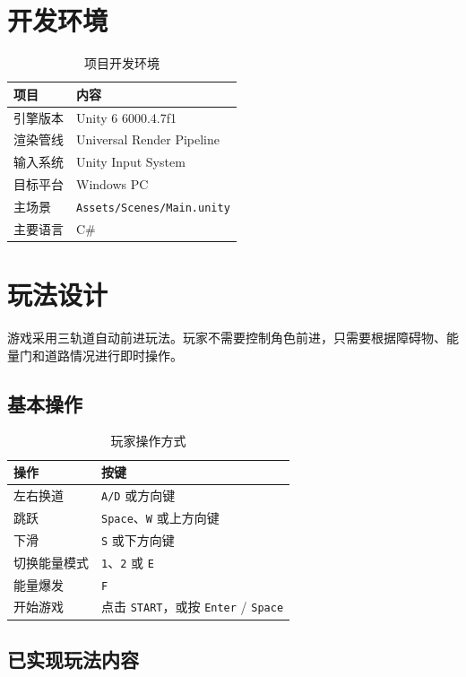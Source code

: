 \documentclass[UTF8,a4paper,12pt]{ctexart}
\begin{document}
\section{开发环境}

\begin{table}[H]
\centering
\begin{tabular}{ll}
\toprule
项目 & 内容 \\
\midrule
引擎版本 & Unity 6 6000.4.7f1 \\
渲染管线 & Universal Render Pipeline \\
输入系统 & Unity Input System \\
目标平台 & Windows PC \\
主场景 & \texttt{Assets/Scenes/Main.unity} \\
主要语言 & C\# \\
\bottomrule
\end{tabular}
\caption{项目开发环境}
\end{table}

\section{玩法设计}

游戏采用三轨道自动前进玩法。玩家不需要控制角色前进，只需要根据障碍物、能量门和道路情况进行即时操作。

\subsection{基本操作}

\begin{table}[H]
\centering
\begin{tabular}{ll}
\toprule
操作 & 按键 \\
\midrule
左右换道 & \texttt{A/D} 或方向键 \\
跳跃 & \texttt{Space}、\texttt{W} 或上方向键 \\
下滑 & \texttt{S} 或下方向键 \\
切换能量模式 & \texttt{1}、\texttt{2} 或 \texttt{E} \\
能量爆发 & \texttt{F} \\
开始游戏 & 点击 \texttt{START}，或按 \texttt{Enter} / \texttt{Space} \\
\bottomrule
\end{tabular}
\caption{玩家操作方式}
\end{table}

\subsection{已实现玩法内容}
\end{document}
